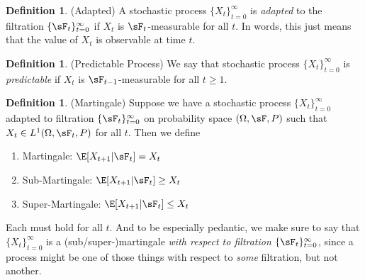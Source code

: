 \documentclass[12pt]{article}
\theoremstyle{plain}
\theoremstyle{definition}
\newtheorem{defn}[thm]{Definition}
\theoremstyle{remark}
\newtheorem*{rmk}{Remark}
\newcommand{\tinfz}{_{t=0}^\infty}
\begin{document}
\begin{defn}(Adapted)
A stochastic process $\{X_t\}\tinfz$ is \emph{adapted} to the filtration
$\{\sF_t\}\tinfz$ if $X_t$ is $\sF_t$-measurable for all $t$.
In words, this just means that the value of $X_t$ is observable at time
$t$.
\end{defn}

\begin{defn}(Predictable Process)
We say that stochastic process $\{X_t\}\tinfz$ is \emph{predictable} if
$X_t$ is $\sF_{t-1}$-measurable for all $t\geq 1$.
\end{defn}

\begin{defn}(Martingale)
Suppose we have a stochastic process $\{X_t\}\tinfz$ adapted to
filtration $\{\sF_t\}\tinfz$ on probability space $(\Omega,\sF,P)$ such
that $X_t\in L^1(\Omega,\sF_t,P)$ for all $t$. Then we define
\begin{enumerate}[label=(\roman*)]
  \item Martingale: $\E[X_{t+1}|\sF_t] = X_t$
  \item Sub-Martingale: $\E[X_{t+1}|\sF_t] \geq X_t$
  \item Super-Martingale: $\E[X_{t+1}|\sF_t] \leq X_t$
\end{enumerate}
Each must hold for all $t$. And to be especially pedantic, we make sure
to say that $\{X_t\}\tinfz$ is a (sub/super-)martingale \emph{with
respect to filtration} $\{\sF_t\}\tinfz$, since a process might be one
of those things with respect to \emph{some} filtration, but not another.
\end{defn}
\end{document}
